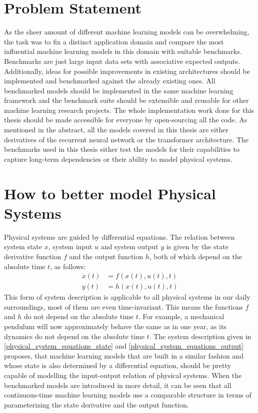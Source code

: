 \documentclass[draft,final]{vutinfth} %
\begin{document}
    \section{Problem Statement}
    As the sheer amount of different machine learning models can be overwhelming, the task was to fix a distinct application domain and compare the most influential machine learning models in this domain with suitable benchmarks.
    Benchmarks are just large input data sets with associative expected outputs.
    Additionally, ideas for possible improvements in existing architectures should be implemented and benchmarked against the already existing ones.
    All benchmarked models should be implemented in the same machine learning framework and the benchmark suite should be extensible and reusable for other machine learning research projects.
    The whole implementation work done for this thesis should be made accessible for everyone by open-sourcing all the code.
    As mentioned in the abstract, all the models covered in this thesis are either derivatives of the recurrent neural network or the transformer \cite{Transformer} architecture.
    The benchmarks used in this thesis either test the models for their capabilities to capture long-term dependencies or their ability to model physical systems.
    
    \section{How to better model Physical Systems} \label{physical_systems}
    Physical systems are guided by differential equations. The relation between system state $x$, system input $u$ and system output $y$ is given by the state derivative function $f$ and the output function $h$, both of which depend on the absolute time $t$, as follows:
    \begin{align} 
        \label{physical_system_equations_state}
        \dot x(t) &= f(x(t),u(t),t) \\
        \label{physical_system_equations_output}
        y(t) &= h(x(t),u(t),t)
    \end{align}
    This form of system description is applicable to all physical systems in our daily surroundings, most of them are even time-invariant. 
    This means the functions $f$ and $h$ do not depend on the absolute time $t$.
    For example, a mechanical pendulum will now approximately behave the same as in one year, as its dynamics do not depend on the absolute time $t$.
    The system description given in \ref{physical_system_equations_state} and \ref{physical_system_equations_output} proposes, that machine learning models that are built in a similar fashion and whose state is also determined by a differential equation, should be pretty capable of modelling the input-output relation of physical systems.
    When the benchmarked models are introduced in more detail, it can be seen that all continuous-time machine learning models use a comparable structure in terms of parameterizing the state derivative and the output function.
    
\end{document}
